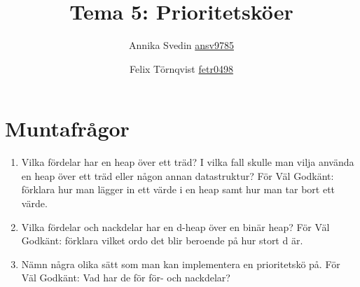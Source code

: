 \documentclass[a5paper,10pt,oneside]{article}
\title{Tema 5: Prioritetsköer}
\author{Annika Svedin \url{ansv9785} \and Felix Törnqvist \url{fetr0498}}
\begin{document}
\maketitle

\section*{Muntafrågor}

\begin{enumerate}
	\item Vilka fördelar har en heap över ett träd? I vilka fall skulle man vilja använda en heap över ett träd eller någon annan datastruktur? För Väl Godkänt: förklara hur man lägger in ett värde i en heap samt hur man tar bort ett värde.
	
	\item
	Vilka fördelar och nackdelar har en d-heap över en binär heap? För Väl Godkänt: förklara vilket ordo det blir beroende på hur stort d är.
	\item
	Nämn några olika sätt som man kan implementera en prioritetskö på. För Väl Godkänt: Vad har de för för- och nackdelar?
\end{enumerate}
\end{document}
